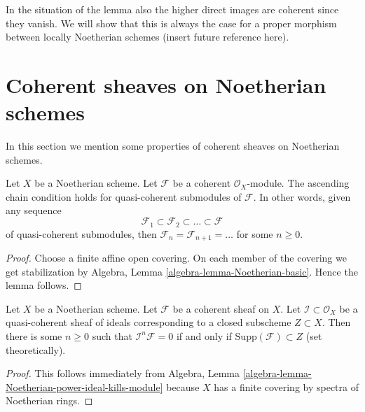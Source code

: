 \noindent
In the situation of the lemma also the higher direct images are
coherent since they vanish.
We will show that this is always the case for a proper morphism
between locally Noetherian schemes (insert future reference here).














\section{Coherent sheaves on Noetherian schemes}
\label{section-coherent-quasi-compact}

\noindent
In this section we mention some properties of coherent sheaves on
Noetherian schemes.

\begin{lemma}
\label{lemma-acc-coherent}
Let $X$ be a Noetherian scheme.
Let $\mathcal{F}$ be a coherent $\mathcal{O}_X$-module.
The ascending chain condition holds for quasi-coherent submodules
of $\mathcal{F}$. In other words, given any sequence
$$
\mathcal{F}_1 \subset \mathcal{F}_2 \subset \ldots \subset \mathcal{F}
$$
of quasi-coherent submodules, then
$\mathcal{F}_n = \mathcal{F}_{n + 1} = \ldots $ for some $n \geq 0$.
\end{lemma}

\begin{proof}
Choose a finite affine open covering.
On each member of the covering we get stabilization by
Algebra, Lemma \ref{algebra-lemma-Noetherian-basic}.
Hence the lemma follows.
\end{proof}

\begin{lemma}
\label{lemma-power-ideal-kills-sheaf}
Let $X$ be a Noetherian scheme.
Let $\mathcal{F}$ be a coherent sheaf on $X$.
Let $\mathcal{I} \subset \mathcal{O}_X$ be a quasi-coherent
sheaf of ideals corresponding to a closed subscheme $Z \subset X$.
Then there is some $n \geq 0$ such that $\mathcal{I}^n\mathcal{F} = 0$
if and only if $\text{Supp}(\mathcal{F}) \subset Z$ (set theoretically).
\end{lemma}

\begin{proof}
This follows immediately from
Algebra, Lemma \ref{algebra-lemma-Noetherian-power-ideal-kills-module}
because $X$ has a finite covering by spectra of Noetherian rings.
\end{proof}

